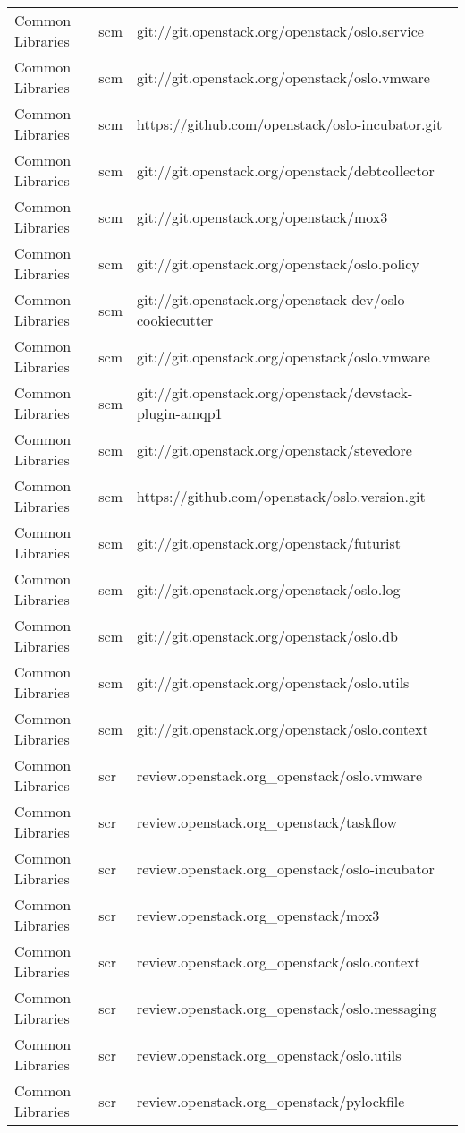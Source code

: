 \begin{center}
\begin{longtable}{|p{4cm}|p{1cm}|p{10cm}|}
Common Libraries&scm&git://git.openstack.org/openstack/oslo.service\\ 
Common Libraries&scm&git://git.openstack.org/openstack/oslo.vmware\\ 
Common Libraries&scm&https://github.com/openstack/oslo-incubator.git\\ 
Common Libraries&scm&git://git.openstack.org/openstack/debtcollector\\ 
Common Libraries&scm&git://git.openstack.org/openstack/mox3\\ 
Common Libraries&scm&git://git.openstack.org/openstack/oslo.policy\\ 
Common Libraries&scm&git://git.openstack.org/openstack-dev/oslo-cookiecutter\\ 
Common Libraries&scm&git://git.openstack.org/openstack/oslo.vmware\\ 
Common Libraries&scm&git://git.openstack.org/openstack/devstack-plugin-amqp1\\ 
Common Libraries&scm&git://git.openstack.org/openstack/stevedore\\ 
Common Libraries&scm&https://github.com/openstack/oslo.version.git\\ 
Common Libraries&scm&git://git.openstack.org/openstack/futurist\\ 
Common Libraries&scm&git://git.openstack.org/openstack/oslo.log\\ 
Common Libraries&scm&git://git.openstack.org/openstack/oslo.db\\ 
Common Libraries&scm&git://git.openstack.org/openstack/oslo.utils\\ 
Common Libraries&scm&git://git.openstack.org/openstack/oslo.context\\ 
Common Libraries&scr&review.openstack.org\_openstack/oslo.vmware\\ 
Common Libraries&scr&review.openstack.org\_openstack/taskflow\\ 
Common Libraries&scr&review.openstack.org\_openstack/oslo-incubator\\ 
Common Libraries&scr&review.openstack.org\_openstack/mox3\\ 
Common Libraries&scr&review.openstack.org\_openstack/oslo.context\\ 
Common Libraries&scr&review.openstack.org\_openstack/oslo.messaging\\ 
Common Libraries&scr&review.openstack.org\_openstack/oslo.utils\\ 
Common Libraries&scr&review.openstack.org\_openstack/pylockfile\\ 

\end{longtable}
\end{center}
